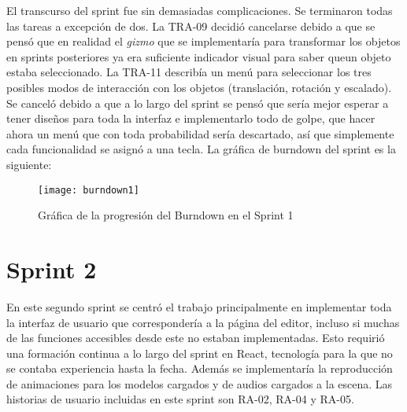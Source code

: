 \begin{table}[H]
\label{TRA-13}
\end{table}

El transcurso del sprint fue sin demasiadas complicaciones. Se terminaron todas las tareas a excepción de dos. La TRA-09 decidió cancelarse debido a que se pensó que en realidad el \textit{gizmo} que se implementaría para transformar los objetos en sprints posteriores ya era suficiente indicador visual para saber queun objeto estaba seleccionado. La TRA-11 describía un menú para seleccionar los tres posibles modos de interacción con los objetos (translación, rotación y escalado). Se canceló debido a que a lo largo del sprint se pensó que sería mejor esperar a tener diseños para toda la interfaz e implementarlo todo de golpe, que hacer ahora un menú que con toda probabilidad sería descartado, así que simplemente cada funcionalidad se asignó a una tecla. La gráfica de burndown del sprint es la siguiente:

\begin{figure}[h]
    \centering
    \texttt{[image: burndown1]}
    \caption[Burndown Sprint 1]{Gráfica de la progresión del Burndown en el Sprint 1}
\end{figure}

\section{Sprint 2}

En este segundo sprint se centró el trabajo principalmente en implementar toda la interfaz de usuario que correspondería a la página del editor, incluso si muchas de las funciones accesibles desde este no estaban implementadas. Esto requirió una formación continua a lo largo del sprint en React, tecnología para la que no se contaba experiencia hasta la fecha. Además se implementaría la reproducción de animaciones para los modelos cargados y de audios cargados a la escena. Las historias de usuario incluidas en este sprint son RA-02, RA-04 y RA-05.

